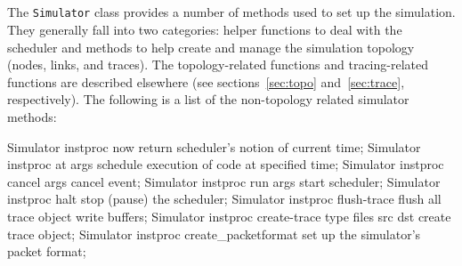\subsection{}

The {\tt Simulator} class provides a number of methods used
to set up the simulation. 
They generally fall into two categories: helper functions to deal
with the scheduler and methods to help create and manage the
simulation topology (nodes, links, and traces).
The topology-related functions and tracing-related functions
are described elsewhere
(see sections~\ref{sec:topo} and~\ref{sec:trace}, respectively).
The following is a list of the non-topology related simulator
methods:
\begin{program}
Simulator instproc now {} \; return scheduler's notion of current time;
Simulator instproc at args \; schedule execution of code at specified time;
Simulator instproc cancel args \; cancel event;
Simulator instproc run args \; start scheduler;
Simulator instproc halt {} \; stop (pause) the scheduler;
Simulator instproc flush-trace {} \; flush all trace object write buffers;
Simulator instproc create-trace { type files src dst } \; create trace object;
Simulator instproc create_packetformat \; set up the simulator's packet format;
\end{program}
